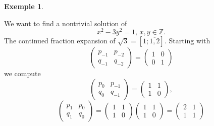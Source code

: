 \documentclass[a4paper,11pt,american]{article}
\theoremstyle{plain}
\theoremstyle{definition}
\newtheorem{example}{Exemple}
\begin{document}
  \begin{example}
    \label{exe:4}

    We want to find a nontrivial solution of
    \begin{displaymath}
      x^2 - 3 y^2 = 1, \, x,y ∈ℤ. 
    \end{displaymath}
    The continued fraction expansion of $\sqrt{3} = [1; \overline{1,2}]$.    Starting with
    \begin{displaymath}
      \begin{pmatrix}
        p_{-1} & p_{-2}  \\
        q_{-1} & q_{-2}  
      \end{pmatrix}
      =
      \begin{pmatrix}
        1 & 0 \\
        0 & 1
      \end{pmatrix} 
    \end{displaymath}
    we compute
    \begin{displaymath}
      \begin{pmatrix}
        p_{0} & p_{-1}  \\
        q_{0} & q_{-1}  
      \end{pmatrix} =
      \begin{pmatrix}
        1 & 1  \\
        1 & 0  
      \end{pmatrix},
    \end{displaymath}
 \begin{displaymath}
      \begin{pmatrix}
        p_{1} & p_{0}  \\
        q_{1} & q_{0}  
      \end{pmatrix} =
      \begin{pmatrix}
        1 & 1  \\
        1 & 0  
      \end{pmatrix}
       \begin{pmatrix}
        1 & 1  \\
        1 & 0  
      \end{pmatrix}  =
      \begin{pmatrix}
        2 & 1  \\
        1 & 1  
      \end{pmatrix} 
    \end{displaymath}



\end{example}
\end{document}
